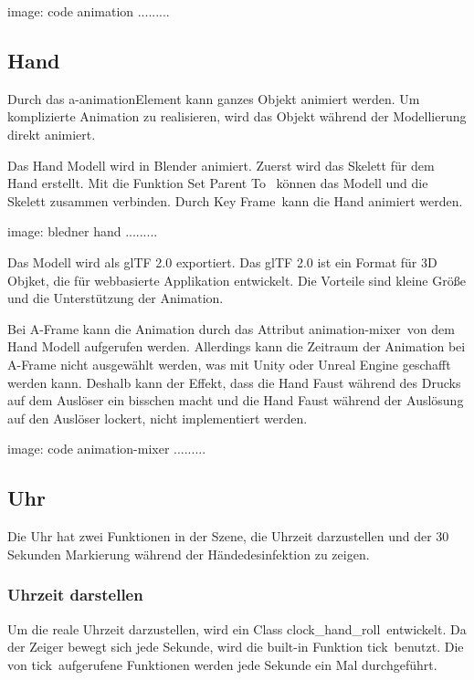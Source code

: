  image: code animation .........
 
 
 \subsection{Hand}
 
 Durch das \glqq a-animation\grqq Element kann ganzes Objekt animiert werden. Um komplizierte Animation zu realisieren, wird das Objekt während der Modellierung direkt animiert.
 
 Das Hand Modell wird in Blender animiert. Zuerst wird das Skelett für dem Hand erstellt. Mit die Funktion \glqq Set Parent To \grqq\ können das Modell und die Skelett zusammen verbinden. Durch \glqq Key Frame\grqq\ kann die Hand animiert werden.
 
 image: bledner hand .........
 
 Das Modell wird als glTF 2.0 exportiert. Das glTF 2.0 ist ein Format für 3D Objket, die für webbasierte Applikation entwickelt. Die Vorteile sind kleine Größe und die Unterstützung der Animation.
 
 Bei A-Frame kann die Animation durch das Attribut \glqq animation-mixer\grqq\ von dem Hand Modell aufgerufen werden. Allerdings kann die Zeitraum der Animation bei A-Frame nicht ausgewählt werden, was mit Unity oder Unreal Engine geschafft werden kann. Deshalb kann der Effekt, dass die Hand Faust während des Drucks auf dem Auslöser ein bisschen macht und die Hand Faust während der Auslösung auf den Auslöser lockert, nicht implementiert werden.
 
 image: code animation-mixer .........
 
 
 \subsection{Uhr}
 
 Die Uhr hat zwei Funktionen in der Szene, die Uhrzeit darzustellen und der 30 Sekunden Markierung während der Händedesinfektion zu zeigen.
 
 \subsubsection{Uhrzeit darstellen}
 Um die reale Uhrzeit darzustellen, wird ein Class \glqq clock\_hand\_roll\grqq\ entwickelt. Da der Zeiger bewegt sich jede Sekunde, wird die built-in Funktion \glqq tick\grqq\ benutzt. Die von \glqq tick\grqq\ aufgerufene Funktionen werden jede Sekunde ein Mal durchgeführt.
 

